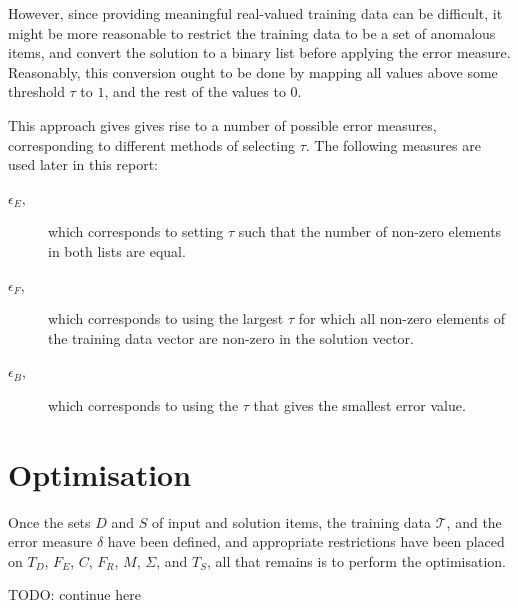 However, since providing meaningful real-valued training data can be difficult, it might be more reasonable to restrict the training data to be a set of anomalous items, and convert the solution to a binary list before applying the error measure. Reasonably, this conversion ought to be done by mapping all values above some threshold $\tau$ to $1$, and the rest of the values to $0$.

This approach gives gives rise to a number of possible error measures, corresponding to different methods of selecting $\tau$. The following measures are used later in this report:
\begin{description}
    \item[$\epsilon_{E}$,]which corresponds to setting $\tau$ such that the number of non-zero elements in both lists are equal.
    \item[$\epsilon_{F}$,]which corresponds to using the largest $\tau$ for which all non-zero elements of the training data vector are non-zero in the solution vector.
    \item[$\epsilon_{B}$,]which corresponds to using the $\tau$ that gives the smallest error value.
\end{description}

\section{Optimisation}

Once the sets $D$ and $S$ of input and solution items, the training data $\mathcal{T}$, and the error measure $\delta$ have been defined, and appropriate restrictions have been placed on $T_D$, $F_E$, $C$, $F_R$, $M$, $\Sigma$, and $T_S$, all that remains is to perform the optimisation.

TODO: continue here
